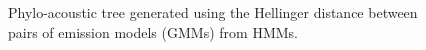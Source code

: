 \documentclass[pdftex,11pt,a4paper]{article}
\theoremstyle{definition}
\theoremstyle{remark}
\begin{document}
\begin{figure}
\noindent{}
    \caption{Phylo-acoustic tree generated using the Hellinger distance between pairs of emission models (GMMs) from HMMs.}
    \label{fig:gmmhellinger}
\end{figure}
\end{document}

